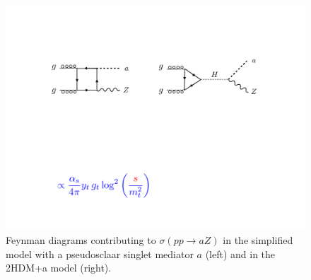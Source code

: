 \documentclass[12pt]{article}
\renewcommand\({\left(}
\renewcommand\){\right)}
\renewcommand\[{\left[}
\renewcommand\]{\right]}
\begin{document}
\begin{figure}
\centering
\includegraphics[width=.8\textwidth]{figures/diagrams}
\caption{\label{fig:diagrams} Feynman diagrams contributing to $\sigma(pp \to a Z)$ in the simplified model with a pseudosclaar singlet mediator $a$ (left) and in the 2HDM+a model (right). }
\end{figure}
		
\end{document}

